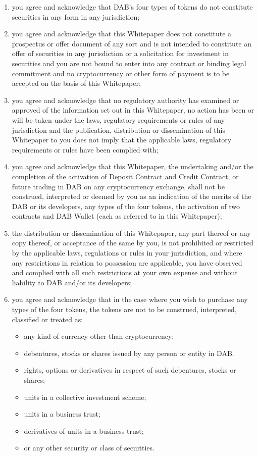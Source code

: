 \documentclass[review]{elsarticle}
\begin{document}
\begin{enumerate}
   \item you agree and acknowledge that DAB's four types of tokens do not constitute securities in any form in any jurisdiction;
   \item you agree and acknowledge that this Whitepaper does not constitute a prospectus or offer document of any sort and is not intended to constitute an offer of securities in any jurisdiction or a solicitation for investment in securities and you are not bound to enter into any contract or binding legal commitment and no cryptocurrency or other form of payment is to be accepted on the basis of this Whitepaper;
   \item you agree and acknowledge that no regulatory authority has examined or approved of the information set out in this Whitepaper, no action has been or will be taken under the laws, regulatory requirements or rules of any jurisdiction and the publication, distribution or dissemination of this Whitepaper to you does not imply that the applicable laws, regulatory requirements or rules have been complied with;
   \item you agree and acknowledge that this Whitepaper, the undertaking and/or the completion of the activation of Deposit Contract and Credit Contract, or future trading in DAB on any cryptocurrency exchange, shall not be construed, interpreted or deemed by you as an indication of the merits of the DAB or its developers, any types of the four tokens, the activation of two contracts and DAB Wallet (each as referred to in this Whitepaper);
   \item the distribution or dissemination of this Whitepaper, any part thereof or any copy thereof, or acceptance of the same by you, is not prohibited or restricted by the applicable laws, regulations or rules in your jurisdiction, and where any restrictions in relation to possession are applicable, you have observed and complied with all such restrictions at your own expense and without liability to DAB and/or its developers;
   \item you agree and acknowledge that in the case where you wish to purchase any types of the four tokens, the tokens are not to be construed, interpreted, classified or treated as:
\begin{itemize}
   \item any kind of currency other than cryptocurrency;
   \item debentures, stocks or shares issued by any person or entity in DAB.
   \item rights, options or derivatives in respect of such debentures, stocks or shares;
   \item units in a collective investment scheme;
   \item units in a business trust;
   \item derivatives of units in a business trust;
   \item or any other security or class of securities.
\end{itemize}


\end{enumerate}
\end{document}
